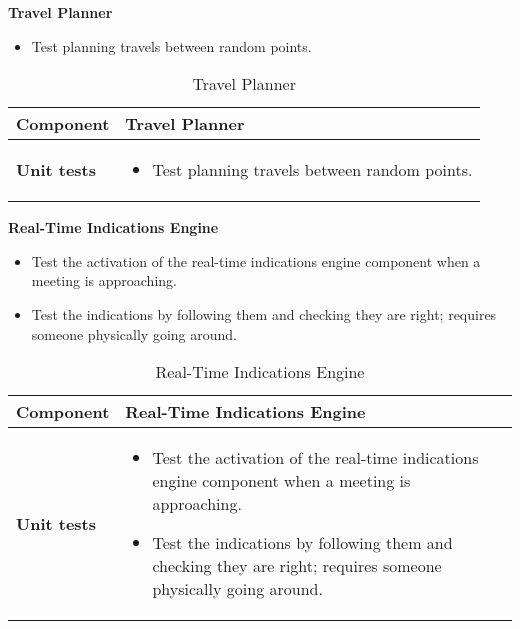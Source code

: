 \textbf{Travel Planner}

\begin{itemize}
\item Test planning travels between random points.
\end{itemize}

\begin{table}[H]	
	\centering
	\def\arraystretch{1.5}
	\begin{tabular}{|m{4cm}|m{12cm}|}
		\hline
		\textbf{Component} & Travel Planner \\ \hline
		\textbf{Unit tests} & 
			\begin{itemize}
			\item Test planning travels between random points.
			\end{itemize} \\ \hline
	\end{tabular}
	\caption{Travel Planner}
\end{table}

\textbf{Real-Time Indications Engine}

\begin{itemize}
\item Test the activation of the real-time indications engine component when a meeting is approaching.
\item Test the indications by following them and checking they are right; requires someone physically going around.
\end{itemize}

\begin{table}[H]	
	\centering
	\def\arraystretch{1.5}
	\begin{tabular}{|m{4cm}|m{12cm}|}
		\hline
		\textbf{Component} & Real-Time Indications Engine \\ \hline
		\textbf{Unit tests} & 
			\begin{itemize}
			\item Test the activation of the real-time indications engine component when a meeting is approaching.
			\item Test the indications by following them and checking they are right; requires someone physically going around.
			\end{itemize} \\ \hline
	\end{tabular}
	\caption{Real-Time Indications Engine}
\end{table}

